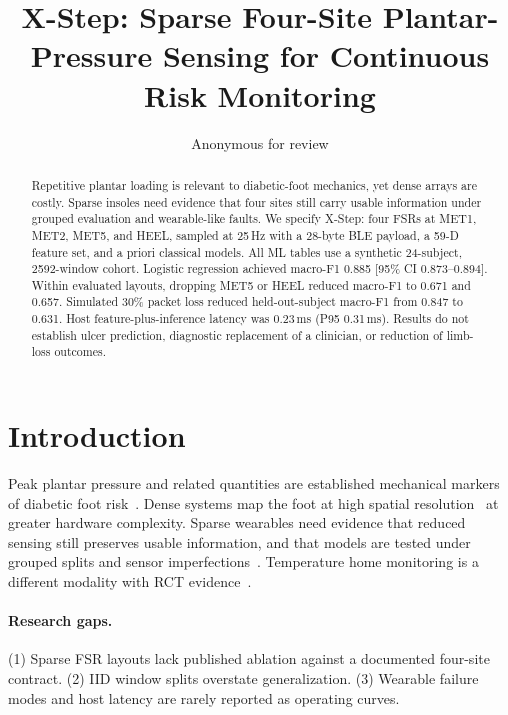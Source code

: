 \documentclass[runningheads]{llncs}
\begin{document}
\title{X-Step: Sparse Four-Site Plantar-Pressure Sensing for Continuous Risk Monitoring}
\author{Anonymous for review}
\maketitle
\begin{abstract}
Repetitive plantar loading is relevant to diabetic-foot mechanics, yet dense arrays are costly. Sparse insoles need evidence that four sites still carry usable information under grouped evaluation and wearable-like faults. We specify X-Step: four FSRs at MET1, MET2, MET5, and HEEL, sampled at 25\,Hz with a 28-byte BLE payload, a 59-D feature set, and a priori classical models. All ML tables use a synthetic 24-subject, 2592-window cohort. Logistic regression achieved macro-F1 0.885 [95\% CI 0.873--0.894]. Within evaluated layouts, dropping MET5 or HEEL reduced macro-F1 to 0.671 and 0.657. Simulated 30\% packet loss reduced held-out-subject macro-F1 from 0.847 to 0.631. Host feature-plus-inference latency was 0.23\,ms (P95 0.31\,ms). Results do not establish ulcer prediction, diagnostic replacement of a clinician, or reduction of limb-loss outcomes.
\end{abstract}

\section{Introduction}
Peak plantar pressure and related quantities are established mechanical markers of diabetic foot risk~\cite{armstrong2017,bus2016,fernando2014}. Dense systems map the foot at high spatial resolution~\cite{razak2012} at greater hardware complexity. Sparse wearables need evidence that reduced sensing still preserves usable information, and that models are tested under grouped splits and sensor imperfections~\cite{hegde2016}. Temperature home monitoring is a different modality with RCT evidence~\cite{armstrong2007,lavery2007,frykberg2017}.

\paragraph{Research gaps.}
(1) Sparse FSR layouts lack published ablation against a documented four-site contract.
(2) IID window splits overstate generalization.
(3) Wearable failure modes and host latency are rarely reported as operating curves.
\end{document}
